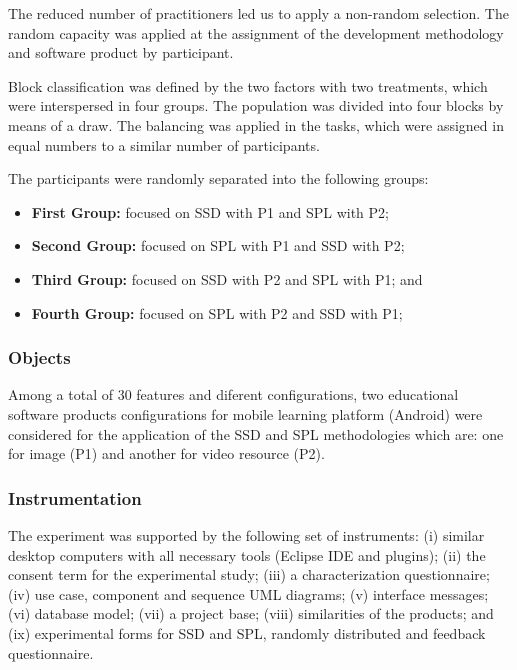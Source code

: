 The reduced number of practitioners led us to apply a non-random selection. The random capacity was applied at the assignment of the development methodology and software product by participant. 

Block classification was defined by the two factors with two treatments, which were interspersed in four groups. The population was divided into four blocks by means of a draw. The balancing was applied in the tasks, which were assigned in equal numbers to a similar number of participants.

The participants were randomly separated into the following groups:

\begin{itemize}
\item \textbf{First Group:} focused on SSD with P1 and SPL with P2;

\item \textbf{Second Group:} focused on SPL with P1 and SSD with P2;

\item \textbf{Third Group:} focused on SSD with P2 and SPL with P1; and

\item \textbf{Fourth Group:} focused on SPL with P2 and SSD with P1;
\end{itemize}

\subsubsection{Objects}

Among a total of 30 features and diferent configurations, two educational software products configurations for mobile learning platform (Android) were considered for the application of the SSD and SPL methodologies which are: one for image (P1) and another for video resource (P2).

\subsubsection{Instrumentation}

The experiment was supported by the following set of instruments: (i) similar desktop computers with all necessary tools (Eclipse IDE and plugins); (ii) the consent term for the experimental study; (iii) a characterization questionnaire; (iv) use case, component and sequence UML diagrams; (v) interface messages; (vi) database model; (vii) a project base; (viii) similarities of the products; and (ix) experimental forms for SSD and SPL, randomly distributed and feedback questionnaire.


